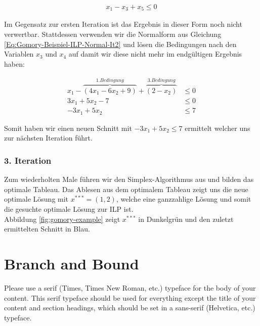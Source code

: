\documentclass[tog]{acmsiggraph}
\begin{document}
\large
\begin{align}
\label{Eq:Gomory-Beispiel It 2 schritt 2}
x_1 - x_3 + x_5 \leq 0
\end{align}
\normalsize

Im Gegensatz zur ersten Iteration ist das Ergebnis in dieser Form noch nicht verwertbar. Stattdessen verwenden wir die Normalform aus Gleichung \ref{Eq:Gomory-Beispiel-ILP-Normal-It2} und lösen die Bedingungen nach den Variablen $x_3$ und $x_4$ auf damit wir diese nicht mehr im endgültigen Ergebnis haben:

\large
\begin{align}
\label{Eq:Gomory-Beispiel It 2 schritt 3}
x_1 - \overbrace{(4x_1 - 6x_2 + 9)}^{1. Bedingung} + \overbrace{(2 - x_2)}^{3. Bedingung} &\leq 0 \nonumber \\
3x_1 + 5x_2 - 7 &\leq 0 \nonumber \\
-3x_1 + 5x_2 &\leq 7
\end{align}
\normalsize

Somit haben wir einen neuen Schnitt mit $-3x_1 + 5x_2 \leq 7$ ermittelt welcher uns zur nächsten Iteration führt.

\subsubsection*{3. Iteration}

Zum wiederholten Male führen wir den Simplex-Algorithmus aus und bilden das optimale Tableau. Das Ablesen aus dem optimalem Tableau zeigt uns die neue optimale Lösung mit $x^{***} = (1, 2)$, welche eine ganzzahlige Lösung und somit die gesuchte optimale Lösung zur ILP ist.\\
Abbildung \ref{fig:gomory-example} zeigt $x^{***}$ in Dunkelgrün und den zuletzt ermittelten Schnitt in Blau.

\section{Branch and Bound}


Please use a serif (Times, Times New Roman, etc.) typeface for the
body of your content. This serif typeface should be used for
everything except the title of your content and section headings,
which should be set in a sans-serif (Helvetica, etc.) typeface.
\end{document}
